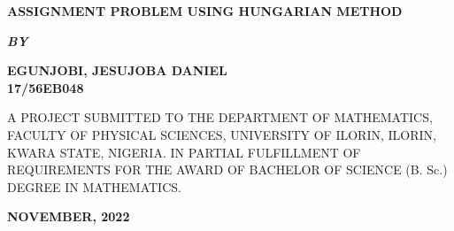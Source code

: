 \documentclass[11pt]{report}
\newcommand{\bt}[1]{\textbf{#1}}
\begin{document}
	
	\clearpage
	\thispagestyle{empty}
	\begin{center}
		\Large \bt{ASSIGNMENT PROBLEM USING HUNGARIAN METHOD}
	\end{center}

	\hspace{7cm}
	
	\begin{center}
		\textbf{\textit{BY}}
	\end{center}
	
	\hspace{5cm}
	
	\begin{center}
		\large \textbf{EGUNJOBI, JESUJOBA DANIEL
			\\
			17/56EB048}
	\end{center}
	
	\hspace{9cm}
	
	\begin{center}
		A PROJECT SUBMITTED TO THE DEPARTMENT OF MATHEMATICS, FACULTY OF PHYSICAL SCIENCES, UNIVERSITY OF ILORIN, ILORIN, KWARA STATE, NIGERIA. 	IN PARTIAL FULFILLMENT OF REQUIREMENTS FOR THE AWARD OF BACHELOR OF SCIENCE (B. Sc.) DEGREE IN MATHEMATICS.
	\end{center}

	\hspace{7cm}
	
	\begin{center}
		\textbf{NOVEMBER, 2022}
	\end{center}

	\newpage
\end{document}
